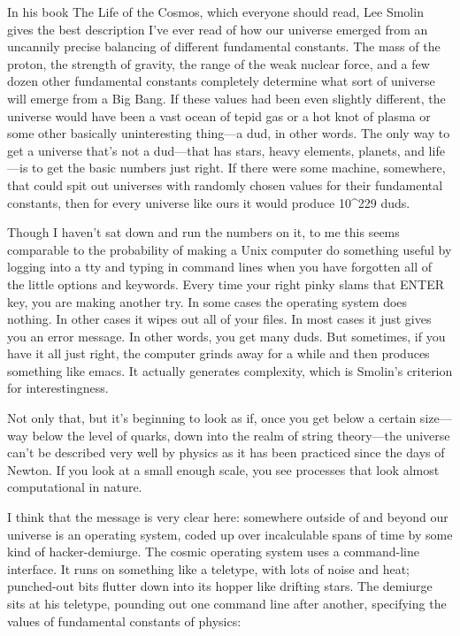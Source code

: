 \documentclass[
  fontsize=11pt,
  paper=landscape,
  twocolumn=true,
  pagesize=pdftex,
  headings=small,
  DIV=15,
  ]{scrartcl}
\begin{document}
In his book The Life of the Cosmos, which everyone should read, Lee
Smolin gives the best description I've ever read of how our universe
emerged from an uncannily precise balancing of different fundamental
constants. The mass of the proton, the strength of gravity, the range of
the weak nuclear force, and a few dozen other fundamental constants
completely determine what sort of universe will emerge from a Big Bang.
If these values had been even slightly different, the universe would
have been a vast ocean of tepid gas or a hot knot of plasma or some
other basically uninteresting thing---a dud, in other words. The only
way to get a universe that's not a dud---that has stars, heavy elements,
planets, and life---is to get the basic numbers just right. If there
were some machine, somewhere, that could spit out universes with
randomly chosen values for their fundamental constants, then for every
universe like ours it would produce 10\^{}229 duds.

Though I haven't sat down and run the numbers on it, to me this seems
comparable to the probability of making a Unix computer do something
useful by logging into a tty and typing in command lines when you have
forgotten all of the little options and keywords. Every time your right
pinky slams that ENTER key, you are making another try. In some cases
the operating system does nothing. In other cases it wipes out all of
your files. In most cases it just gives you an error message. In other
words, you get many duds. But sometimes, if you have it all just right,
the computer grinds away for a while and then produces something like
emacs. It actually generates complexity, which is Smolin's criterion for
interestingness.

Not only that, but it's beginning to look as if, once you get below a
certain size---way below the level of quarks, down into the realm of
string theory---the universe can't be described very well by physics as
it has been practiced since the days of Newton. If you look at a small
enough scale, you see processes that look almost computational in
nature.

I think that the message is very clear here: somewhere outside of and
beyond our universe is an operating system, coded up over incalculable
spans of time by some kind of hacker-demiurge. The cosmic operating
system uses a command-line interface. It runs on something like a
teletype, with lots of noise and heat; punched-out bits flutter down
into its hopper like drifting stars. The demiurge sits at his teletype,
pounding out one command line after another, specifying the values of
fundamental constants of physics:
\end{document}
